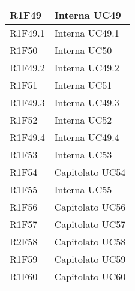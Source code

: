 \begin{center}
\begin{longtable}{|p{22mm}|p{44mm}|}
R1F49 &
Interna \newline
UC49 
\\
\hline

R1F49.1 &
Interna \newline
UC49.1 
\\
\hline

R1F50 &
Interna \newline
UC50 
\\
\hline

R1F49.2 &
Interna \newline
UC49.2 
\\
\hline

R1F51 &
Interna \newline
UC51 
\\
\hline

R1F49.3 &
Interna \newline
UC49.3 
\\
\hline

R1F52 &
Interna \newline
UC52 
\\
\hline

R1F49.4 &
Interna \newline
UC49.4 
\\
\hline

R1F53 &
Interna \newline
UC53 
\\
\hline

R1F54 &
Capitolato \newline
UC54 
\\
\hline

R1F55 &
Interna \newline
UC55 
\\
\hline

R1F56 &
Capitolato \newline
UC56 
\\
\hline

R1F57 &
Capitolato \newline
UC57 
\\
\hline

R2F58 &
Capitolato \newline
UC58 
\\
\hline

R1F59 &
Capitolato \newline
UC59 
\\
\hline

R1F60 &
Capitolato \newline
UC60 
\\
\hline


\end{longtable}
\end{center}
